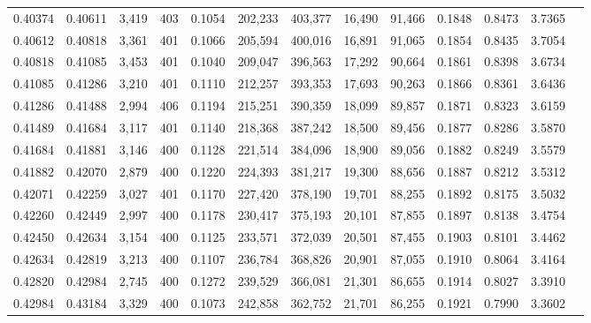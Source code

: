 \begin{tabular}{rrrrrrrrrrrrr}
0.40374 & 0.40611 & 3,419 & 403 &                                     0.1054 & 202,233 & 403,377 &  16,490 &  91,466 & 0.1848 & 0.8473 & 3.7365 \\
0.40612 & 0.40818 & 3,361 & 401 &                                     0.1066 & 205,594 & 400,016 &  16,891 &  91,065 & 0.1854 & 0.8435 & 3.7054 \\
0.40818 & 0.41085 & 3,453 & 401 &                                     0.1040 & 209,047 & 396,563 &  17,292 &  90,664 & 0.1861 & 0.8398 & 3.6734 \\
0.41085 & 0.41286 & 3,210 & 401 &                                     0.1110 & 212,257 & 393,353 &  17,693 &  90,263 & 0.1866 & 0.8361 & 3.6436 \\
0.41286 & 0.41488 & 2,994 & 406 &                                     0.1194 & 215,251 & 390,359 &  18,099 &  89,857 & 0.1871 & 0.8323 & 3.6159 \\
0.41489 & 0.41684 & 3,117 & 401 &                                     0.1140 & 218,368 & 387,242 &  18,500 &  89,456 & 0.1877 & 0.8286 & 3.5870 \\
0.41684 & 0.41881 & 3,146 & 400 &                                     0.1128 & 221,514 & 384,096 &  18,900 &  89,056 & 0.1882 & 0.8249 & 3.5579 \\
0.41882 & 0.42070 & 2,879 & 400 &                                     0.1220 & 224,393 & 381,217 &  19,300 &  88,656 & 0.1887 & 0.8212 & 3.5312 \\
0.42071 & 0.42259 & 3,027 & 401 &                                     0.1170 & 227,420 & 378,190 &  19,701 &  88,255 & 0.1892 & 0.8175 & 3.5032 \\
0.42260 & 0.42449 & 2,997 & 400 &                                     0.1178 & 230,417 & 375,193 &  20,101 &  87,855 & 0.1897 & 0.8138 & 3.4754 \\
0.42450 & 0.42634 & 3,154 & 400 &                                     0.1125 & 233,571 & 372,039 &  20,501 &  87,455 & 0.1903 & 0.8101 & 3.4462 \\
0.42634 & 0.42819 & 3,213 & 400 &                                     0.1107 & 236,784 & 368,826 &  20,901 &  87,055 & 0.1910 & 0.8064 & 3.4164 \\
0.42820 & 0.42984 & 2,745 & 400 &                                     0.1272 & 239,529 & 366,081 &  21,301 &  86,655 & 0.1914 & 0.8027 & 3.3910 \\
0.42984 & 0.43184 & 3,329 & 400 &                                     0.1073 & 242,858 & 362,752 &  21,701 &  86,255 & 0.1921 & 0.7990 & 3.3602 \\

\end{tabular}
